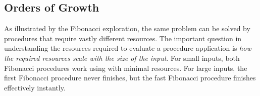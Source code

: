 \begin{schemeregion}
\section{Orders of Growth}\label{sec:orders-of-growth}

As illustrated by the Fibonacci exploration, the same problem can be solved by procedures that require vastly different resources.  The important question in understanding the resources required to evaluate a procedure application is \emph{how the required resources scale with the size of the input}.  For small inputs, both Fibonacci procedures work using with minimal resources.  For large inputs, the first Fibonacci procedure never finishes, but the fast Fibonacci procedure finishes effectively instantly.  



\end{schemeregion}
